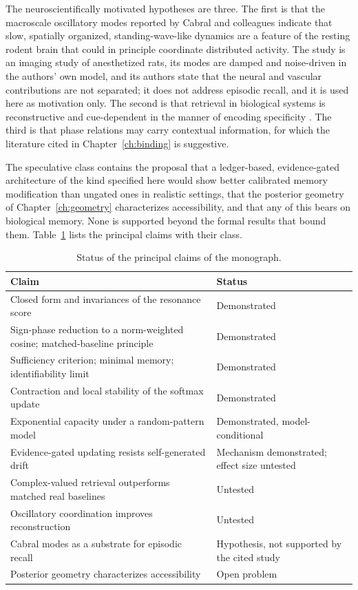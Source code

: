 The neuroscientifically motivated hypotheses are three. The first is that the macroscale oscillatory modes reported by Cabral and colleagues \cite{cabral2023} indicate that slow, spatially organized, standing-wave-like dynamics are a feature of the resting rodent brain that could in principle coordinate distributed activity. The study is an imaging study of anesthetized rats, its modes are damped and noise-driven in the authors' own model, and its authors state that the neural and vascular contributions are not separated; it does not address episodic recall, and it is used here as motivation only. The second is that retrieval in biological systems is reconstructive and cue-dependent in the manner of encoding specificity \cite{tulving1973}. The third is that phase relations may carry contextual information, for which the literature cited in Chapter~\ref{ch:binding} is suggestive.

The speculative class contains the proposal that a ledger-based, evidence-gated architecture of the kind specified here would show better calibrated memory modification than ungated ones in realistic settings, that the posterior geometry of Chapter~\ref{ch:geometry} characterizes accessibility, and that any of this bears on biological memory. None is supported beyond the formal results that bound them. Table~\ref{tab:status} lists the principal claims with their class.

\begin{table}[t]
\centering
\small
\renewcommand{\arraystretch}{1.2}
\begin{tabularx}{\textwidth}{@{}>{\raggedright\arraybackslash}X>{\raggedright\arraybackslash}p{3.6cm}@{}}
\toprule
Claim & Status\\
\midrule
Closed form and invariances of the resonance score & Demonstrated\\
Sign-phase reduction to a norm-weighted cosine; matched-baseline principle & Demonstrated\\
Sufficiency criterion; minimal memory; identifiability limit & Demonstrated\\
Contraction and local stability of the softmax update & Demonstrated\\
Exponential capacity under a random-pattern model & Demonstrated, model-conditional\\
Evidence-gated updating resists self-generated drift & Mechanism demonstrated; effect size untested\\
Complex-valued retrieval outperforms matched real baselines & Untested\\
Oscillatory coordination improves reconstruction & Untested\\
Cabral modes as a substrate for episodic recall & Hypothesis, not supported by the cited study\\
Posterior geometry characterizes accessibility & Open problem\\
\bottomrule
\end{tabularx}
\caption{Status of the principal claims of the monograph.}\label{tab:status}
\end{table}

